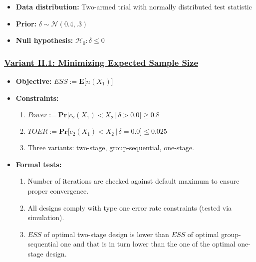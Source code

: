 \documentclass[
]{book}
\providecommand{\tightlist}{%
  \setlength{\itemsep}{0pt}\setlength{\parskip}{0pt}}
\begin{document}
\begin{itemize}
\tightlist
\item
  \textbf{Data distribution:} Two-armed trial with normally distributed test statistic
\item
  \textbf{Prior:} \(\delta\sim\mathcal{N}(0.4, .3)\)
\item
  \textbf{Null hypothesis:} \(\mathcal{H}_0:\delta \leq 0\)
\end{itemize}

\hypertarget{variant-ii.1-minimizing-expected-sample-size}{%
\subsubsection{\texorpdfstring{\protect\hyperlink{variantII_1}{Variant II.1: Minimizing Expected Sample Size}}{Variant II.1: Minimizing Expected Sample Size}}\label{variant-ii.1-minimizing-expected-sample-size}}

\begin{itemize}
\tightlist
\item
  \textbf{Objective:} \(ESS := \boldsymbol{E}\big[n(X_1)\big]\)
\item
  \textbf{Constraints:}

  \begin{enumerate}
  \def\labelenumi{\arabic{enumi}.}
  \tightlist
  \item
    \(Power := \boldsymbol{Pr}\big[c_2(X_1) < X_2\,|\,\delta> 0.0\big] \geq 0.8\)
  \item
    \(TOER := \boldsymbol{Pr}\big[c_2(X_1) < X_2\,|\,\delta=0.0\big] \leq 0.025\)
  \item
    Three variants: two-stage, group-sequential, one-stage.
  \end{enumerate}
\item
  \textbf{Formal tests:}

  \begin{enumerate}
  \def\labelenumi{\arabic{enumi}.}
  \tightlist
  \item
    Number of iterations are checked against default maximum to ensure proper
    convergence.
  \item
    All designs comply with type one error rate constraints (tested via
    simulation).
  \item
    \(ESS\) of optimal two-stage design is lower than \(ESS\) of optimal
    group-sequential one and that is in turn lower than the one of the
    optimal one-stage design.
  \end{enumerate}
\end{itemize}
\end{document}
